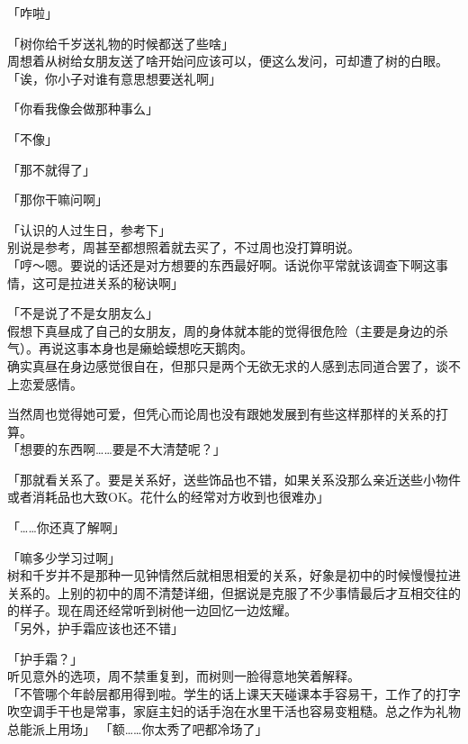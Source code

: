 「咋啦」

「树你给千岁送礼物的时候都送了些啥」\\

周想着从树给女朋友送了啥开始问应该可以，便这么发问，可却遭了树的白眼。\\

「诶，你小子对谁有意思想要送礼啊」

「你看我像会做那种事么」

「不像」

「那不就得了」

「那你干嘛问啊」

「认识的人过生日，参考下」\\

别说是参考，周甚至都想照着就去买了，不过周也没打算明说。\\

「哼～嗯。要说的话还是对方想要的东西最好啊。话说你平常就该调查下啊这事情，这可是拉进关系的秘诀啊」

「不是说了不是女朋友么」\\

假想下真昼成了自己的女朋友，周的身体就本能的觉得很危险（主要是身边的杀气）。再说这事本身也是癞蛤蟆想吃天鹅肉。\\

确实真昼在身边感觉很自在，但那只是两个无欲无求的人感到志同道合罢了，谈不上恋爱感情。

当然周也觉得她可爱，但凭心而论周也没有跟她发展到有些这样那样的关系的打算。\\

「想要的东西啊……要是不大清楚呢？」

「那就看关系了。要是关系好，送些饰品也不错，如果关系没那么亲近送些小物件或者消耗品也大致OK。花什么的经常对方收到也很难办」

「……你还真了解啊」

「嘛多少学习过啊」\\

树和千岁并不是那种一见钟情然后就相思相爱的关系，好象是初中的时候慢慢拉进关系的。上别的初中的周不清楚详细，但据说是克服了不少事情最后才互相交往的的样子。现在周还经常听到树他一边回忆一边炫耀。\\

「另外，护手霜应该也还不错」

「护手霜？」\\

听见意外的选项，周不禁重复到，而树则一脸得意地笑着解释。\\

「不管哪个年龄层都用得到啦。学生的话上课天天碰课本手容易干，工作了的打字吹空调手干也是常事，家庭主妇的话手泡在水里干活也容易变粗糙。总之作为礼物总能派上用场」
「额……你太秀了吧都冷场了」

